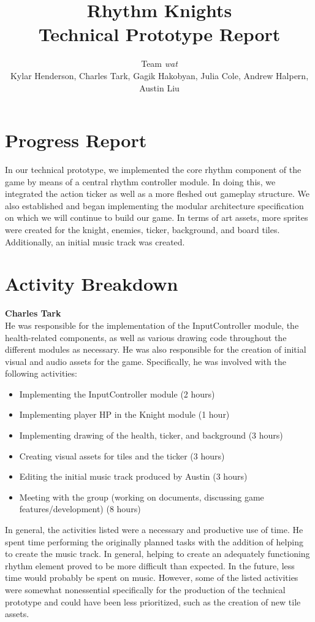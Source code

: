 \documentclass[]{article}
\makeatletter
\renewcommand{\maketitle}{\bgroup\setlength{\parindent}{0pt}
\begin{flushleft}
  \huge{\textbf{\@title}}

  \large{\@author}
\end{flushleft}\egroup
}
\makeatother
\begin{document}
\title{\textbf{Rhythm Knights} \\ Technical Prototype Report}
\author{Team \emph{wat} \\
  \small{Kylar Henderson, Charles Tark, 
    Gagik Hakobyan, Julia Cole, Andrew Halpern, Austin Liu}}
\date{} %

\section*{Progress Report}
In our technical prototype, we implemented the core rhythm component
of the game by means of a central rhythm controller module.  In doing
this, we integrated the action ticker as well as a more fleshed out
gameplay structure.  We also established and began implementing the
modular architecture specification on which we will continue to build
our game.  In terms of art assets, more sprites were created for the
knight, enemies, ticker, background, and board tiles.  Additionally,
an initial music track was created.

\section*{Activity Breakdown}

\textbf{Charles Tark} \\
He was responsible for the implementation of the InputController
module, the health-related components, as well as various drawing code
throughout the different modules as necessary.  He was also
responsible for the creation of initial visual and audio assets for
the game. Specifically, he was involved with the following
activities:
\begin{itemize}
\item Implementing the InputController module (2 hours)
\item Implementing player HP in the Knight module (1 hour)
\item Implementing drawing of the health, ticker, and background (3 hours)
\item Creating visual assets for tiles and the ticker (3 hours)
\item Editing the initial music track produced by Austin (3 hours)
\item Meeting with the group (working on documents, 
  discussing game features/development) (8 hours)
\end{itemize}
In general, the activities listed were a necessary and productive use
of time.  He spent time performing the originally planned
tasks with the addition of helping to create the music track.  In
general, helping to create an adequately functioning rhythm element
proved to be more difficult than expected.  In the future, less time
would probably be spent on music.  However, some of the listed
activities were somewhat nonessential specifically for the production
of the technical prototype and could have been less prioritized, such
as the creation of new tile assets.\\
\end{document}
